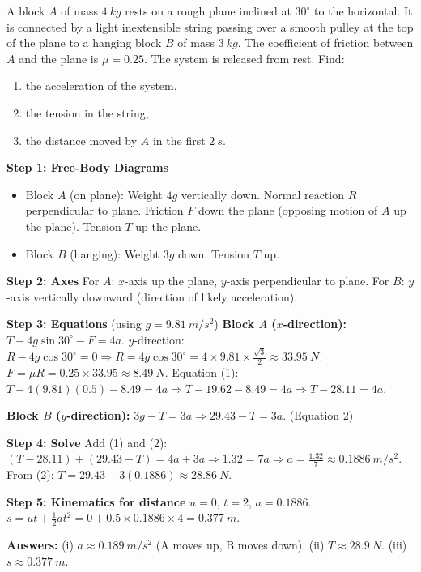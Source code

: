 \documentclass[11pt]{article}
\begin{document}
\begin{exoresolu}
A block $A$ of mass $\SI{4}{kg}$ rests on a rough plane inclined at $30^\circ$ to the horizontal. It is connected by a light inextensible string passing over a smooth pulley at the top of the plane to a hanging block $B$ of mass $\SI{3}{kg}$. The coefficient of friction between $A$ and the plane is $\mu = 0.25$. The system is released from rest. Find:
\begin{enumerate}
    \item the acceleration of the system,
    \item the tension in the string,
    \item the distance moved by $A$ in the first $\SI{2}{s}$.
\end{enumerate}
\tcblower
\textbf{Step 1: Free-Body Diagrams}
\begin{itemize}
    \item Block $A$ (on plane): Weight $4g$ vertically down. Normal reaction $R$ perpendicular to plane. Friction $F$ down the plane (opposing motion of $A$ up the plane). Tension $T$ up the plane.
    \item Block $B$ (hanging): Weight $3g$ down. Tension $T$ up.
\end{itemize}

\textbf{Step 2: Axes}
For $A$: $x$-axis up the plane, $y$-axis perpendicular to plane.
For $B$: $y$-axis vertically downward (direction of likely acceleration).

\textbf{Step 3: Equations} (using $g = \SI{9.81}{m/s^2}$)
\textbf{Block $A$ ($x$-direction):} $T - 4g\sin30^\circ - F = 4a$.
$y$-direction: $R - 4g\cos30^\circ = 0 \Rightarrow R = 4g\cos30^\circ = 4 \times 9.81 \times \frac{\sqrt{3}}{2} \approx \SI{33.95}{N}$.
$F = \mu R = 0.25 \times 33.95 \approx \SI{8.49}{N}$.
Equation (1): $T - 4(9.81)(0.5) - 8.49 = 4a \Rightarrow T - 19.62 - 8.49 = 4a \Rightarrow T - 28.11 = 4a$.

\textbf{Block $B$ ($y$-direction):} $3g - T = 3a \Rightarrow 29.43 - T = 3a$. \quad (Equation 2)

\textbf{Step 4: Solve}
Add (1) and (2): $(T - 28.11) + (29.43 - T) = 4a + 3a \Rightarrow 1.32 = 7a \Rightarrow a = \frac{1.32}{7} \approx \SI{0.1886}{m/s^2}$.
From (2): $T = 29.43 - 3(0.1886) \approx \SI{28.86}{N}$.

\textbf{Step 5: Kinematics for distance}
$u=0$, $t=2$, $a=0.1886$. $s = ut + \frac{1}{2}at^2 = 0 + 0.5 \times 0.1886 \times 4 = \SI{0.377}{m}$.

\textbf{Answers:} (i) $a \approx \SI{0.189}{m/s^2}$ (A moves up, B moves down). (ii) $T \approx \SI{28.9}{N}$. (iii) $s \approx \SI{0.377}{m}$.
\end{exoresolu}
\end{document}
